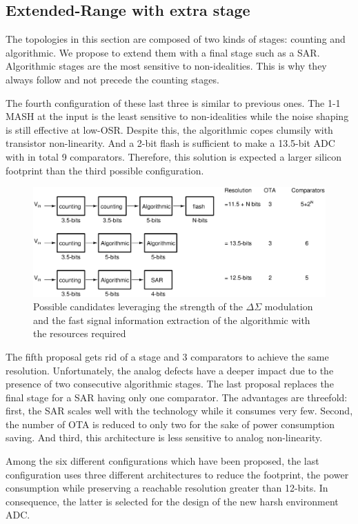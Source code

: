 \subsection{Extended-Range with extra stage}
The topologies in this section are composed of two kinds of stages: counting and algorithmic. We propose to extend them with a final stage such as a SAR\@. Algorithmic stages are the most sensitive to non-idealities. This is why they always follow and not precede the counting stages.

The fourth configuration of these last three is similar to previous ones. The 1-1 MASH at the input is the least sensitive to non-idealities while the noise shaping is still effective at low-OSR\@. Despite this, the algorithmic copes clumsily with transistor non-linearity. And a 2-bit flash is sufficient to make a 13.5-bit ADC with in total 9 comparators. Therefore, this solution is expected a larger silicon footprint than the third possible configuration.

\begin{figure}[htp]
	\centering
	\includegraphics[width=.9\textwidth]{Chapter4/Figs/study/counting-algo-conversion.ps}
	\caption{Possible candidates leveraging the strength of the \(\Delta \Sigma\) modulation and the fast signal information extraction of the algorithmic with the resources required }
	\label{fig:counting-algo-candidates}
\end{figure}

The fifth proposal gets rid of a stage and 3 comparators to achieve the same resolution. Unfortunately, the analog defects have a deeper impact due to the presence of two consecutive algorithmic stages. The last proposal replaces the final stage for a SAR having only one comparator. The advantages are threefold: first, the SAR scales well with the technology while it consumes very few. Second, the number of OTA is reduced to only two for the sake of power consumption saving. And third, this architecture is less sensitive to analog non-linearity.

Among the six different configurations which have been proposed, the last configuration uses three different architectures to reduce the footprint, the power consumption while preserving a reachable resolution greater than 12-bits. In consequence, the latter is selected for the design of the new harsh environment ADC\@.

